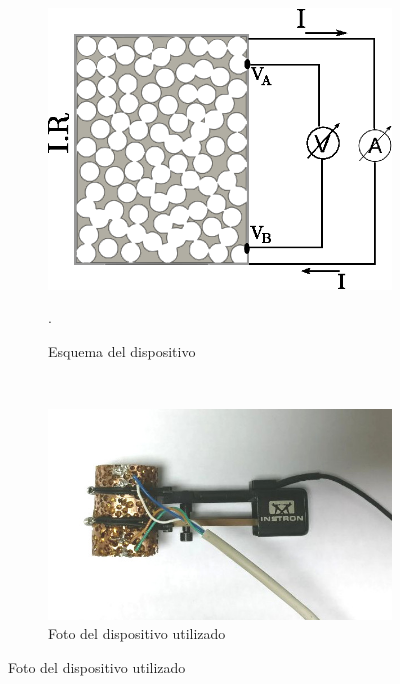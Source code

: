 \documentclass[a4paper,12pt,fleqn,twoside,openany]{book}
\begin{document}
 
 \begin{figure}
    \centering
    \begin{subfigure}{0.4\textwidth}
        \includegraphics[width=\textwidth]{Img/Procedimiento/CuatroPuntas1.eps}
	\caption{Esquema del dispositivo}. 
	\label{fig:CuatroPuntas}
    \end{subfigure}
    ~ %
    \begin{subfigure}{0.4\textwidth}
        \includegraphics[width=\textwidth]{Img/Procedimiento/cpfoto.jpg}
        \caption{Foto del dispositivo utilizado}
        \label{fig:cuatropuntasyextensometro}
    \end{subfigure}
\end{figure}
\end{document}
